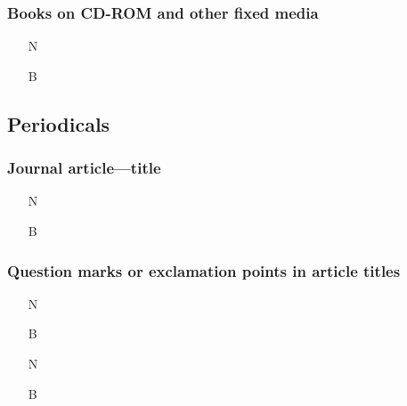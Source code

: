 \documentclass[11pt,letterpaper,oneside]{article}
\begin{document}
\subsubsection{Books on CD-ROM and other fixed media}

\begin{itemize}
\item[N] 

\item[B] 
\end{itemize}



\setcounter{subsection}{1}
\subsection{Periodicals}
\setcounter{subsection}{14}

\setcounter{subsubsection}{175}
\subsubsection{Journal article---title}

\begin{itemize}
\item[N] 

\item[B] 
\end{itemize}

\setcounter{subsubsection}{177}
\subsubsection{Question marks or exclamation points in article titles}

\begin{itemize}
\item[N] 

\item[B] 

\item[N] 

\item[B] 
\end{itemize}
\end{document}
